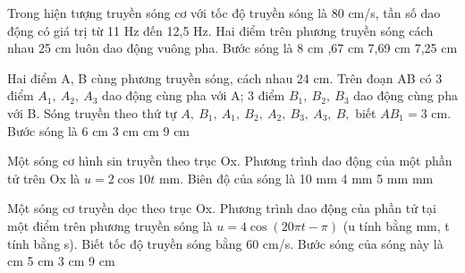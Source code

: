 \begin{ex}%
Trong hiện tượng truyền sóng cơ với tốc độ truyền sóng là 80 cm/s, tần số dao động có giá trị từ 11 Hz đến 12,5 Hz. Hai điểm trên phương truyền sóng cách nhau 25 cm luôn dao động vuông pha. Bước sóng là
\choice
{8 cm}
{,67 cm}
{7,69 cm}
{7,25 cm}
\end{ex} 
\begin{ex}%
Hai điểm A, B cùng phương truyền sóng, cách nhau 24 cm. Trên đoạn AB có 3 điểm $A_1,\ A_2,\ A_3$ dao động cùng pha với A; 3 điểm $B_1,\ B_2,\ B_3$ dao động cùng pha với B. Sóng truyền theo thứ tự $A,\ B_1,\ A_1,\ B_2,\ A_2,\ B_3,\ A_3,\ B,$ biết $AB_1 = 3$ cm. Bước sóng là
\choice
{6 cm}
{3 cm}
{ cm}
{9 cm}
\end{ex} 
\begin{ex}%
 Một sóng cơ hình sin truyền theo trục Ox. Phương trình dao động của một phần tử trên Ox là $u=2\cos 10t$ mm. Biên độ của sóng là
\choice
{10 mm}
{4 mm}
{5 mm}
{ mm}
\end{ex} 
\begin{ex}%
Một sóng cơ truyền dọc theo trục Ox. Phương trình dao động của phần tử tại một điểm trên phương truyền sóng là $u = 4\cos(20\pi t - \pi )$ (u tính bằng mm, t tính bằng s). Biết tốc độ truyền sóng bằng 60 cm/s. Bước sóng của sóng này là
\choice
{ cm}
{5 cm}
{3 cm}
{9 cm}
\end{ex} 
